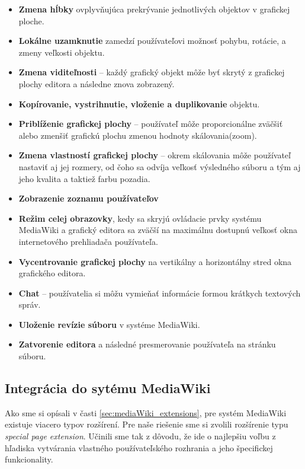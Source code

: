 \begin{itemize}
	\item \textbf{Zmena hĺbky} ovplyvňujúca prekrývanie jednotlivých objektov v grafickej ploche.
	
	\item \textbf{Lokálne uzamknutie} zamedzí používateľovi možnosť pohybu, rotácie, a zmeny veľkosti objektu.
	
	\item \textbf{Zmena viditeľnosti} -- každý grafický objekt môže byť skrytý z grafickej plochy editora a následne znova zobrazený.
	
	\item \textbf{Kopírovanie, vystrihnutie, vloženie a duplikovanie} objektu.
	
	\item \textbf{Priblíženie grafickej plochy} -- používateľ môže proporcionálne zväčšiť alebo zmenšiť grafickú plochu zmenou hodnoty skálovania(zoom).
	
	\item \textbf{Zmena vlastností grafickej plochy} -- okrem skálovania môže používateľ nastaviť aj jej rozmery, od čoho sa odvíja veľkosť výsledného súboru a tým aj jeho kvalita a taktiež farbu pozadia. 
	
	\item \textbf{Zobrazenie zoznamu používateľov}
	
	\item \textbf{Režim celej obrazovky}, kedy sa skryjú ovládacie prvky systému MediaWiki a grafický editora sa zväčší na maximálnu dostupnú veľkosť okna internetového prehliadača používateľa.
	
	\item \textbf{Vycentrovanie grafickej plochy} na vertikálny a horizontálny stred okna grafického editora.
	
	\item \textbf{Chat} -- používatelia si môžu vymieňať informácie formou krátkych textových správ. 
	
	\item \textbf{Uloženie revízie súboru} v systéme MediaWiki. 
	
	\item \textbf{Zatvorenie editora} a následné presmerovanie používateľa na stránku súboru.
\end{itemize}

\subsection{Integrácia do sytému MediaWiki}
Ako sme si opísali v časti \ref{sec:mediaWiki_extensions}, pre systém MediaWiki existuje viacero typov rozšírení. Pre naše riešenie sme si zvolili rozšírenie typu \textit{special page extension}. Učinili sme tak z dôvodu, že ide o najlepšiu voľbu z hľadiska vytvárania vlastného používateľského rozhrania a jeho špecifickej funkcionality. 

